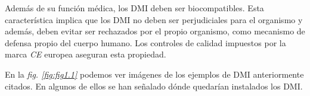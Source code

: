 Además de su función médica, los DMI deben ser biocompatibles. Esta característica implica que los DMI no deben ser perjudiciales para el organismo y además, deben evitar ser rechazados por el propio organismo, como mecanismo de defensa propio del cuerpo humano. Los controles de calidad impuestos por la marca \textit{CE} europea aseguran esta propiedad.

En la \textit{fig. \ref{fig:fig1.1}} podemos ver imágenes de los ejemplos de DMI anteriormente citados. En algunos de ellos se han señalado dónde quedarían instalados los DMI.

\begin{figure}[!htb]
    \centering

\end{figure}
